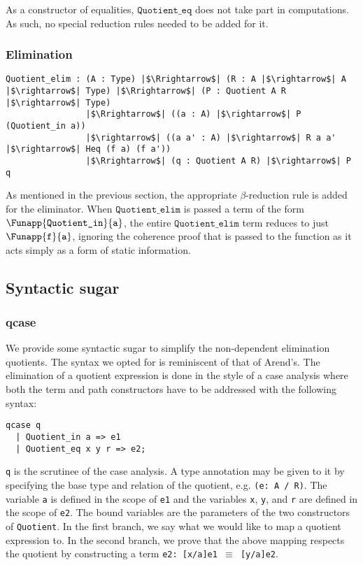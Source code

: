 \documentclass[12pt,twoside,maitrise]{dms}
\theoremstyle{definition}
\numberwithin{equation}{section}
\numberwithin{table}{chapter}
\numberwithin{figure}{chapter}
\newcommand\id[1] {\texttt{#1}}
\newcommand\fn[1] {\texttt{#1}}
\begin{document}
As a constructor of equalities, $\id{Quotient\_eq}$ does not take part in
computations. As such, no special reduction rules needed to be added for it.

\subsubsection*{Elimination}

\begin{verbatim}
Quotient_elim : (A : Type) |$\Rrightarrow$| (R : A |$\rightarrow$| A |$\rightarrow$| Type) |$\Rrightarrow$| (P : Quotient A R |$\rightarrow$| Type)
                |$\Rrightarrow$| ((a : A) |$\rightarrow$| P (Quotient_in a))
                |$\rightarrow$| ((a a' : A) |$\rightarrow$| R a a' |$\rightarrow$| Heq (f a) (f a'))
                |$\Rrightarrow$| (q : Quotient A R) |$\rightarrow$| P q
\end{verbatim}

As mentioned in the previous section, the appropriate $\beta$-reduction rule is
added for the eliminator. When $\id{Quotient\_elim}$ is passed a term of the
form $\Funapp{\id{Quotient\_in}}{\id{a}}$, the entire $\id{Quotient\_elim}$ term
reduces to just $\Funapp{\id{f}}{\id{a}}$, ignoring the coherence proof that is
passed to the function as it acts simply as a form of static information.

\subsection{Syntactic sugar}

\subsubsection*{qcase}

We provide some syntactic sugar to simplify the non-dependent elimination
quotients. The syntax we opted for is reminiscent of that of
Arend's\cite{arend}. The elimination of a quotient expression is done in the
style of a case analysis where both the term and path constructors have to be
addressed with the following syntax:

\begin{verbatim}
qcase q
  | Quotient_in a => e1
  | Quotient_eq x y r => e2;
\end{verbatim}

\id{q} is the scrutinee of the case analysis. A type annotation may be given to it
by specifying the base type and relation of the quotient, e.g. \fn{(e: A / R)}.
The variable \id{a} is defined in the scope of \id{e1} and the variables \id{x},
\id{y}, and \id{r} are defined in the scope of \id{e2}. The bound variables are
the parameters of the two constructors of \id{Quotient}. In the first branch, we
say what we would like to map a quotient expression to. In the second branch, we
prove that the above mapping respects the quotient by constructing a term
\fn{e2: [x/a]e1 $\equiv$ [y/a]e2}.
\end{document}

